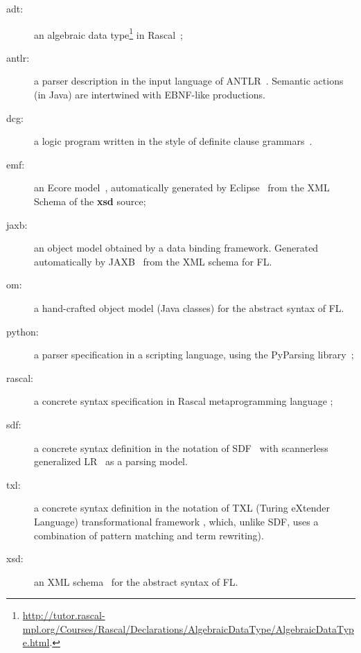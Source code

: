\documentclass[a4paper]{report}
\begin{document}
\begin{description}
\item[adt:] an algebraic data type\footnote{\url{http://tutor.rascal-mpl.org/Courses/Rascal/Declarations/AlgebraicDataType/AlgebraicDataType.html}.} in Rascal~\cite{RascalTutor};
\item[antlr:] a parser description in the input language of ANTLR~\cite{ANTLR}.
Semantic actions (in Java) are intertwined with EBNF-like productions.
\item[dcg:] a logic program written in the style of definite clause grammars~\cite{DCG}.
\item[emf:] an %
	Ecore model~\cite{MOF}, automatically generated by Eclipse~\cite{EMF} from the XML Schema of the
	\textbf{xsd} source;
\item[jaxb:] an object model obtained by a data binding framework.
Generated automatically by JAXB~\cite{JSR31} from the XML schema for FL.
\item[om:] a hand-crafted object model (Java classes) for the abstract syntax of FL.
\item[python:] a parser specification in a scripting language, using the PyParsing library~\cite{McGuire2007};
\item[rascal:] a concrete syntax specification in Rascal metaprogramming language \cite{RascalTutor,Rascal};
\item[sdf:] a concrete syntax definition in the notation of SDF~\cite{Klint93} with scannerless
generalized LR~\cite{EKV09,Visser97} as a parsing model.
\item[txl:] a concrete syntax definition in the notation of TXL (Turing eXtender Language) transformational framework \cite{DeanCMS02}, which, unlike SDF, uses a combination of pattern matching and term rewriting).
\item[xsd:] an XML schema~\cite{W3C-XSD} for the abstract syntax of FL.
\end{description}

\tableofcontents













\newpage

\end{document}

